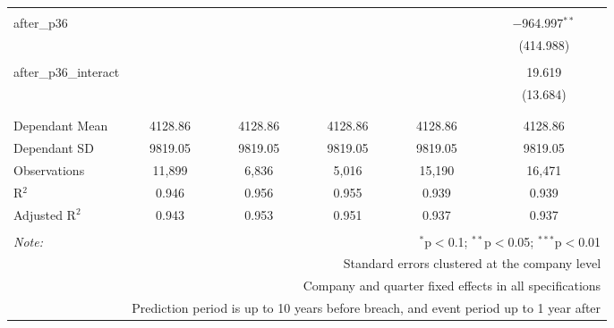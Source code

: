 \begin{table}[!htbp]
\begin{tabular}{@{\extracolsep{5pt}}lccccc}
  & & & & & \\ 
 after\_p36 &  &  &  &  & $-$964.997$^{**}$ \\ 
  &  &  &  &  & (414.988) \\ 
  & & & & & \\ 
 after\_p36\_interact &  &  &  &  & 19.619 \\ 
  &  &  &  &  & (13.684) \\ 
  & & & & & \\ 
\hline \\[-1.8ex] 
Dependant Mean & 4128.86 & 4128.86 & 4128.86 & 4128.86 & 4128.86 \\ 
Dependant SD & 9819.05 & 9819.05 & 9819.05 & 9819.05 & 9819.05 \\ 
Observations & 11,899 & 6,836 & 5,016 & 15,190 & 16,471 \\ 
R$^{2}$ & 0.946 & 0.956 & 0.955 & 0.939 & 0.939 \\ 
Adjusted R$^{2}$ & 0.943 & 0.953 & 0.951 & 0.937 & 0.937 \\ 
\hline 
\hline \\[-1.8ex] 
\textit{Note:}  & \multicolumn{5}{r}{$^{*}$p$<$0.1; $^{**}$p$<$0.05; $^{***}$p$<$0.01} \\ 
 & \multicolumn{5}{r}{Standard errors clustered at the company level} \\ 
 & \multicolumn{5}{r}{Company and quarter fixed effects in all specifications} \\ 
 & \multicolumn{5}{r}{Prediction period is up to 10 years before breach, and event period up to 1 year after} \\ 
\end{tabular} 
\end{table} 
